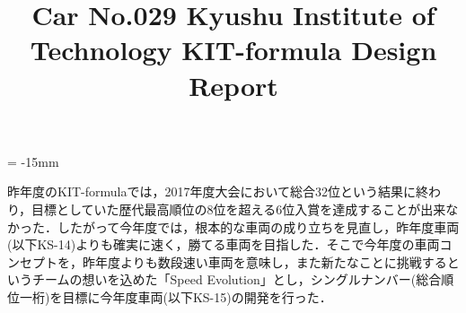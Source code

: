\documentclass[10pt]{jarticle}
\begin{document}
\footnotesize %



\date{\vspace{-15mm}}
\title{\vspace{-18mm} \small Car No.029 Kyushu Institute of Technology KIT-formula Design Report}

\oddsidemargin = -15mm
\maketitle %
\thispagestyle{empty}



昨年度のKIT-formulaでは，2017年度大会において総合32位という結果に終わり，目標としていた歴代最高順位の8位を超える6位入賞を達成することが出来なかった．したがって今年度では，根本的な車両の成り立ちを見直し，昨年度車両(以下KS-14)よりも確実に速く，勝てる車両を目指した．そこで今年度の車両コンセプトを，昨年度よりも数段速い車両を意味し，また新たなことに挑戦するというチームの想いを込めた「Speed Evolution」とし，シングルナンバー(総合順位一桁)を目標に今年度車両(以下KS-15)の開発を行った．
\end{document}

